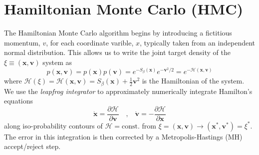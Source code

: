 \documentclass[a4paper,11pt]{article}
\newcommand{\x}{\mathbf{x}}
\newcommand{\p}{\mathbf{v}}
\begin{document}
\section{\label{sec:hmc}Hamiltonian Monte Carlo (HMC)}
%
The Hamiltonian Monte Carlo algorithm begins by introducing a fictitious
momentum, \(v\), for each coordinate varible, $x$, typically taken
from an independent normal distribution.
%
This allows us to write the joint target density of the \(\xi \equiv (\x, \p)\)
system as
%
\begin{equation}
    p(\x, \p) = p(\x) p(\p) = e^{-S_{\beta}(\x)} e^{-\p^2 / 2} = e^{-\mathcal{H} (\x, \p)}
\end{equation}
%
where \(\mathcal{H}(\xi) = \mathcal{H}(\x, \p) = S_{\beta}(\x) + \frac{1}{2} \p^2
\) is the Hamiltonian of the system.
%
We use the \emph{leapfrog integrator} to approximately numerically integrate
Hamilton's equations
%
\begin{equation}
    \dot{\x} = \frac{\partial \mathcal{H}}{\partial \p}\quad \text{,} \quad
    \dot{\p} = - \frac{\partial \mathcal{H}}{\partial \x}
\end{equation}
%
along iso-probability contours of \(\mathcal{H} =\text{const.}\) from \(\xi =
(\x,\p)\rightarrow (\x^{\ast}, \p^{\ast}) = \xi^{\ast}\).
%
The error in this integration is then corrected by a Metropolis-Hastings (MH)
accept/reject step.
%
\end{document}
